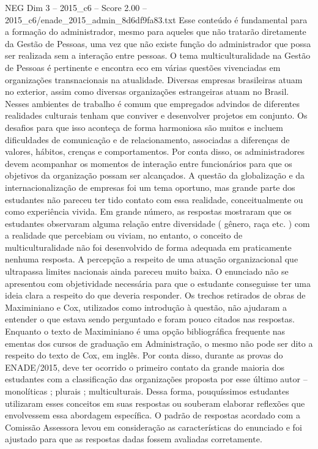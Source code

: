 \begin{textsample}{NEG Dim 3 – 2015\_c6 – Score 2.00 – 2015\_c6/enade\_2015\_admin\_8d6df9fa83.txt}
Esse conteúdo é fundamental para a formação do administrador, mesmo para aqueles que não tratarão diretamente da Gestão de Pessoas, uma vez que não existe função do administrador que possa ser realizada sem a interação entre pessoas.
O tema multiculturalidade na Gestão de Pessoas é pertinente e encontra eco em várias questões vivenciadas em organizações transnacionais na atualidade.
Diversas empresas brasileiras atuam no exterior, assim como diversas organizações estrangeiras atuam no Brasil.
Nesses ambientes de trabalho é comum que empregados advindos de diferentes realidades culturais tenham que conviver e desenvolver projetos em conjunto.
Os desafios para que isso aconteça de forma harmoniosa são muitos e incluem dificuldades de comunicação e de relacionamento, associadas a diferenças de valores, hábitos, crenças e comportamentos.
Por conta disso, os administradores devem acompanhar os momentos de interação entre funcionários para que os objetivos da organização possam ser alcançados.
A questão da globalização e da internacionalização de empresas foi um tema oportuno, mas grande parte dos estudantes não pareceu ter tido contato com essa realidade, conceitualmente ou como experiência vivida.
Em grande número, as respostas mostraram que os estudantes observaram alguma relação entre diversidade ( gênero, raça etc. ) com a realidade que percebiam ou viviam, no entanto, o conceito de multiculturalidade não foi desenvolvido de forma adequada em praticamente nenhuma resposta.
A percepção a respeito de uma atuação organizacional que ultrapassa limites nacionais ainda pareceu muito baixa.
O enunciado não se apresentou com objetividade necessária para que o estudante conseguisse ter uma ideia clara a respeito do que deveria responder.
Os trechos retirados de obras de Maximiniano e Cox, utilizados como introdução à questão, não ajudaram a entender o que estava sendo perguntado e foram pouco citados nas respostas.
Enquanto o texto de Maximiniano é uma opção bibliográfica frequente nas ementas dos cursos de graduação em Administração, o mesmo não pode ser dito a respeito do texto de Cox, em inglês.
Por conta disso, durante as provas do ENADE/2015, deve ter ocorrido o primeiro contato da grande maioria dos estudantes com a classificação das organizações proposta por esse último autor – monolíticas ; plurais ; multiculturais.
Dessa forma, pouquíssimos estudantes utilizaram esses conceitos em suas respostas ou souberam elaborar reflexões que envolvessem essa abordagem específica.
O padrão de respostas acordado com a Comissão Assessora levou em consideração as características do enunciado e foi ajustado para que as respostas dadas fossem avaliadas corretamente.

\end{textsample}
